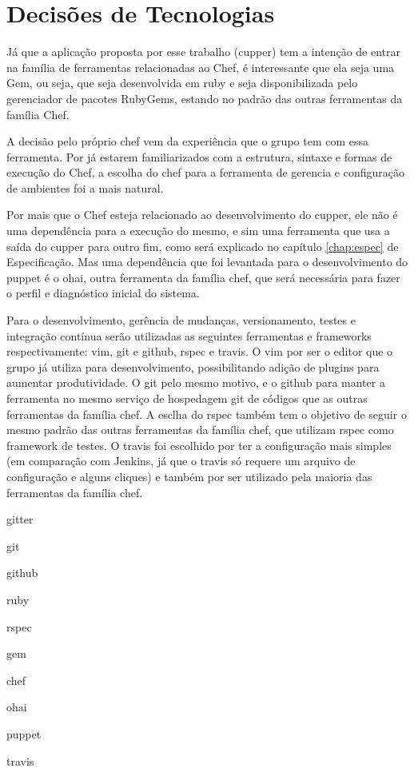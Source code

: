 \section{Decisões de Tecnologias}

Já que a aplicação proposta por esse trabalho (cupper) tem a intenção de entrar na família de ferramentas relacionadas ao Chef, é interessante que ela seja uma Gem, ou seja, que seja desenvolvida em ruby e seja disponibilizada pelo gerenciador de pacotes RubyGems, estando no padrão das outras ferramentas da família Chef.

A decisão pelo próprio chef vem da experiência que o grupo tem com essa ferramenta. Por já estarem familiarizados com a estrutura, sintaxe e formas de execução do Chef, a escolha do chef para a ferramenta de gerencia e configuração de ambientes foi a mais natural.

Por mais que o Chef esteja relacionado ao desenvolvimento do cupper, ele não é uma dependência para a execução do mesmo, e sim uma ferramenta que usa a saída do cupper para outro fim, como será explicado no capítulo \ref{chap:espec} de Especificação. Mas uma dependência que foi levantada para o desenvolvimento do puppet é o ohai, outra ferramenta da família chef, que será necessária para fazer o perfil e diagnóstico inicial do sistema.

Para o desenvolvimento, gerência de mudanças, versionamento, testes e integração contínua serão utilizadas as seguintes ferramentas e frameworks respectivamente: vim, git e github, rspec e travis. O vim por ser o editor que o grupo já utiliza para desenvolvimento, possibilitando adição de plugins para aumentar produtividade. O git pelo mesmo motivo, e o github para manter a ferramenta no mesmo serviço de hospedagem git de códigos que as outras ferramentas da família chef. A esclha do rspec também tem o objetivo de seguir o mesmo padrão das outras ferramentas da família chef, que utilizam rspec como framework de testes. O travis foi escolhido por ter a configuração mais simples (em comparação com Jenkins, já que o travis só requere um arquivo de configuração e alguns cliques) e também por ser utilizado pela maioria das ferramentas da família chef.



gitter

git

github

ruby

rspec

gem

chef

ohai

puppet

travis

